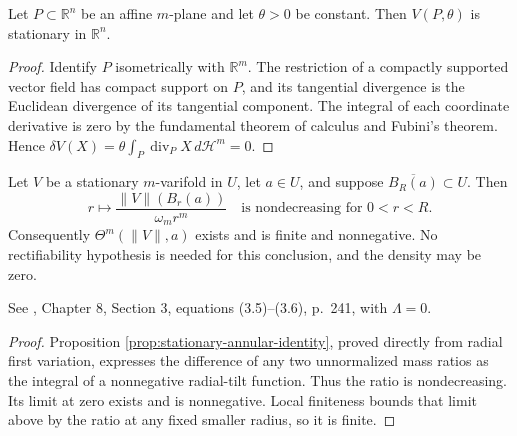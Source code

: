\begin{proposition}\label{prop:plane-stationary}
Let $P\subset\mathbb{R}^n$ be an affine $m$-plane and let $\theta>0$ be constant. Then $V(P,\theta)$ is stationary in $\mathbb{R}^n$.
\end{proposition}
\begin{proof}
Identify $P$ isometrically with $\mathbb{R}^m$. The restriction of a compactly supported vector field has compact support on $P$, and its tangential divergence is the Euclidean divergence of its tangential component. The integral of each coordinate derivative is zero by the fundamental theorem of calculus and Fubini's theorem. Hence $\delta V(X)=\theta\int_P\operatorname{div}_P X\,d\mathcal{H}^m=0$.
\end{proof}

\begin{theorem}\label{thm:stationary-monotonicity}
Let $V$ be a stationary $m$-varifold in $U$, let $a\in U$, and suppose $\overline{B_R(a)}\subset U$. Then
\[
 r\longmapsto\frac{\|V\|(B_r(a))}{\omega_mr^m}
 \quad\text{is nondecreasing for }0<r<R.
\]
Consequently $\Theta^m(\|V\|,a)$ exists and is finite and nonnegative. No rectifiability hypothesis is needed for this conclusion, and the density may be zero.

See \cite{Sim18}, Chapter 8, Section 3, equations (3.5)--(3.6), p.~241, with $\Lambda=0$.
\end{theorem}
\begin{proof}
Proposition \ref{prop:stationary-annular-identity}, proved directly from radial first variation, expresses the difference of any two unnormalized mass ratios as the integral of a nonnegative radial-tilt function. Thus the ratio is nondecreasing. Its limit at zero exists and is nonnegative. Local finiteness bounds that limit above by the ratio at any fixed smaller radius, so it is finite.
\end{proof}
